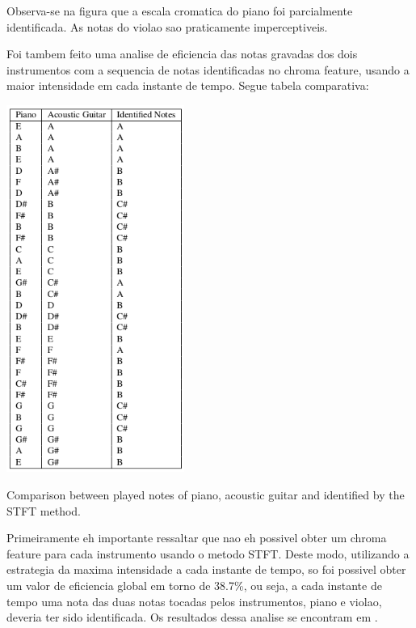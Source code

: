 \documentclass{article}
\begin{document}
	Observa-se na figura  que a escala cromatica do piano foi parcialmente identificada. As notas do violao sao praticamente imperceptiveis.

	Foi tambem feito uma analise de eficiencia das notas gravadas dos dois instrumentos com a sequencia de notas identificadas no chroma feature, usando a maior intensidade em cada instante de tempo. Segue tabela comparativa:

	\begin{table}[h]
	 \begin{center}
	 	\centerline{
	 \includegraphics[width=\columnwidth,height=12cm]{figs/tabela_2.png}}
	 \end{center}
	 \caption{Comparison between played notes of piano, acoustic guitar and identified by the STFT method.}
	 \label{tab:table-2-sfft}
	\end{table}

	Primeiramente eh importante ressaltar que nao eh possivel obter um chroma feature para cada instrumento usando o metodo STFT. Deste modo, utilizando a estrategia da maxima intensidade a cada instante de tempo, so foi possivel obter um valor de eficiencia global em torno de 38.7\%, ou seja, a cada instante de tempo uma nota das duas notas tocadas pelos instrumentos, piano e violao, deveria ter sido identificada. Os resultados dessa analise se encontram em .

\end{document}
